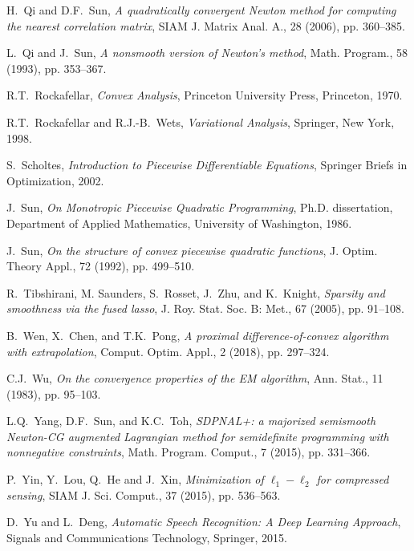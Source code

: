 \documentclass{siamart}
\begin{document}
\begin{thebibliography}{999}
{
{\sc H.\ Qi and D.F.\ Sun},
{\sl A quadratically convergent Newton method for computing the nearest correlation matrix},
SIAM J. Matrix Anal. A., 28 (2006), pp. 360--385.

{\sc L.\ Qi and J.\ Sun},
{\sl A nonsmooth version of Newton’s method},
Math. Program.,  58 (1993), pp. 353--367.


{\sc R.T.\ Rockafellar},
{\sl Convex Analysis},
 Princeton University Press, Princeton, 1970.

{\sc R.T.\ Rockafellar and R.J.-B.\ Wets},
{\sl Variational Analysis}, Springer, New York, 1998.


{\sc S.\ Scholtes},
{\sl Introduction to Piecewise Differentiable Equations},
Springer Briefs in Optimization, 2002.

{\sc J.\ Sun},
{\sl On Monotropic Piecewise Quadratic Programming},
 Ph.D. dissertation, Department of Applied Mathematics, University of Washington, 1986.

{\sc J.\ Sun},
{\sl On the structure of convex piecewise quadratic functions},
J. Optim. Theory Appl., 72 (1992), pp. 499--510.


{\sc R.\ Tibshirani, M. Saunders, S.\ Rosset, J.\ Zhu, and K.\ Knight},
{\sl Sparsity and smoothness via the fused lasso},
 J. Roy. Stat. Soc. B: Met., 67 (2005), pp. 91--108.

{\sc B.\ Wen, X.\ Chen, and T.K.\ Pong},
{\sl A proximal difference-of-convex algorithm with extrapolation},
Comput. Optim. Appl.,  2 (2018), pp. 297--324.

{\sc C.J.\ Wu},
{\sl  On the convergence properties of the EM algorithm},
Ann. Stat.,  11 (1983), pp. 95--103.

{\sc L.Q.\ Yang, D.F.\ Sun, and K.C.\ Toh},
{\sl SDPNAL+: a majorized semismooth Newton-CG augmented Lagrangian method for semidefinite programming with nonnegative constraints},
Math. Program. Comput., 7 (2015), pp. 331--366.

{\sc P.\ Yin, Y.\ Lou, Q.\ He and J.\ Xin},
{\sl Minimization of $\ell_1-\ell_2$ for compressed sensing},
SIAM J. Sci. Comput., 37 (2015), pp. 536--563.

{\sc D.\ Yu and L.\ Deng},
{\sl Automatic Speech Recognition: A Deep Learning Approach},
Signals and Communications Technology, Springer, 2015.

}
\end{thebibliography}
\end{document}
